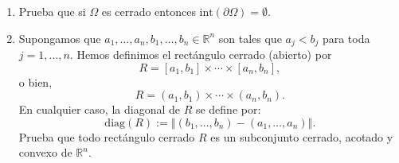 \documentclass[12pt]{article}
\newcommand{\norm}[1]{\left\Vert#1\right\Vert}
\newcommand{\diag}{\mathrm{diag}}
\newcommand{\Int}{\mathrm{int}}
\newcommand{\N}{\mathbb N}
\newcommand{\R}{\mathbb R}
\begin{document}
\begin{enumerate}
\begin{itemize}
    Para cada $k \in \N$, definimos
    \[
    (x_k, y_k) = \left(x_0 + \frac{1}{k}, y_0\right).
    \]
    Observamos que
    \[
    x_k = x_0 + \frac{1}{k} = y_0^2 + \frac{1}{k} > y_0^2 = y_k^2,
    \]
    por lo que $(x_k, y_k) \in \Omega$ para toda $k \in \N$. Además,
    \[
    \lim_{k \to \infty} (x_k, y_k) = \lim_{k \to \infty} \left(x_0 + \frac{1}{k}, y_0\right) = (x_0, y_0).
    \]
    Por lo tanto, $(x_0, y_0)$ es un punto de acumulación de $\Omega$, y así $(x_0, y_0) \in \overline{\Omega}$.
\end{itemize}

En ambos casos, $(x_0, y_0) \in \overline{\Omega}$, lo que demuestra que
\[
\{ (x,y)\in \R^2 : x \geq y^2 \} \subseteq \overline{\Omega}.
\]

Combinando ambas contenciones, concluimos que
\[
\overline{\Omega} = \{ (x,y)\in \R^2 : x \geq y^2 \}.
\]

\item Prueba que si $\Omega$ es cerrado entonces 
$\Int(\partial \Omega)=\emptyset$.

\item Supongamos que $a_1,\ldots,a_n,b_1,\ldots,b_n\in \R^n$ son tales que $a_j<b_j$ para toda $j=1,\ldots,n$. Hemos definimos el rectángulo cerrado (abierto) por
\[ R = [a_1,b_1]\times \cdots\times [a_n,b_n], \]
o bien,
\[ R = (a_1,b_1)\times \cdots\times (a_n,b_n). \]
En cualquier caso, la \textsf{diagonal} de $R$ se define por:
\[ \diag(R) := \norm{(b_1,\ldots,b_n) - (a_1,\ldots,a_n)}. \]
Prueba que todo rectángulo cerrado $R$ es un subconjunto cerrado, acotado y convexo de $\R^n$. 

\end{enumerate}
\end{document}
